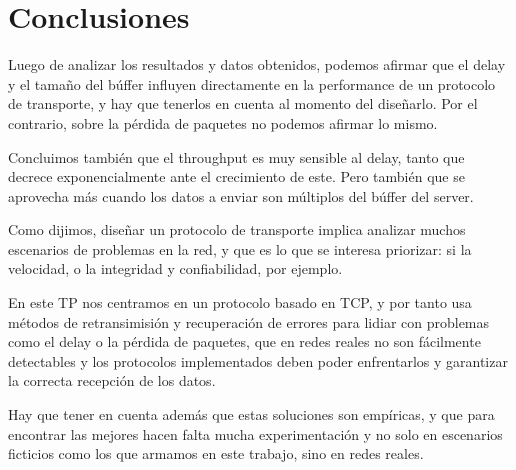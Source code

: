 \section{Conclusiones}

Luego de analizar los resultados y datos obtenidos, podemos afirmar que el delay y el tama\~no del b\'uffer influyen directamente en la performance de un protocolo de transporte, y hay que tenerlos en cuenta al momento del dise\~narlo. Por el contrario, sobre la p\'erdida de paquetes no podemos afirmar lo mismo. 

Concluimos tambi\'en que el throughput es muy sensible al delay, tanto que decrece exponencialmente ante el crecimiento de este. Pero tambi\'en que se aprovecha m\'as cuando los datos a enviar son m\'ultiplos del b\'uffer del server. 

Como dijimos, dise\~nar un protocolo de transporte implica analizar muchos escenarios de problemas en la red, y que es lo que se interesa priorizar: si la velocidad, o la integridad y confiabilidad, por ejemplo. 

En este TP nos centramos en un protocolo basado en TCP, y por tanto usa m\'etodos de retransimisi\'on y recuperaci\'on de errores para lidiar con problemas como el delay o la p\'erdida de paquetes, que en redes reales no son f\'acilmente detectables y los protocolos implementados deben poder enfrentarlos y garantizar la correcta recepci\'on de los datos. 

Hay que tener en cuenta adem\'as que estas soluciones son emp\'iricas, y que para encontrar las mejores hacen falta mucha experimentaci\'on y no solo en escenarios ficticios como los que armamos en este trabajo, sino en redes reales. 




